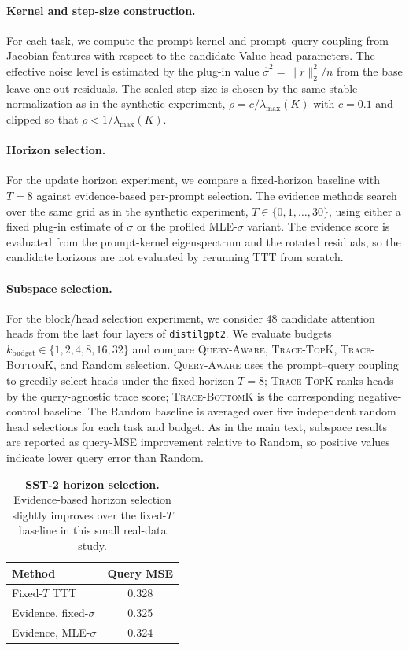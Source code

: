 \documentclass{article}
\theoremstyle{plain}
\theoremstyle{definition}
\theoremstyle{remark}
\begin{document}
\paragraph{Kernel and step-size construction.}
For each task, we compute the prompt kernel and prompt--query coupling from Jacobian features with respect to the candidate Value-head parameters. The effective noise level is estimated by the plug-in value $\hat\sigma^2=\|r\|_2^2/n$ from the base leave-one-out residuals. The scaled step size is chosen by the same stable normalization as in the synthetic experiment, $\rho=c/\lambda_{\max}(K)$ with $c=0.1$ and clipped so that $\rho<1/\lambda_{\max}(K)$.

\paragraph{Horizon selection.}
For the update horizon experiment, we compare a fixed-horizon baseline with $T=8$ against evidence-based per-prompt selection. The evidence methods search over the same grid as in the synthetic experiment, $T\in\{0,1,\ldots,30\}$, using either a fixed plug-in estimate of $\sigma$ or the profiled MLE-$\sigma$ variant. The evidence score is evaluated from the prompt-kernel eigenspectrum and the rotated residuals, so the candidate horizons are not evaluated by rerunning TTT from scratch.

\paragraph{Subspace selection.}
For the block/head selection experiment, we consider 48 candidate attention heads from the last four layers of \texttt{distilgpt2}. We evaluate budgets $k_{\text{budget}}\in\{1,2,4,8,16,32\}$ and compare \textsc{Query-Aware}, \textsc{Trace-TopK}, \textsc{Trace-BottomK}, and Random selection. \textsc{Query-Aware} uses the prompt--query coupling to greedily select heads under the fixed horizon $T=8$; \textsc{Trace-TopK} ranks heads by the query-agnostic trace score; \textsc{Trace-BottomK} is the corresponding negative-control baseline. The Random baseline is averaged over five independent random head selections for each task and budget. As in the main text, subspace results are reported as query-MSE improvement relative to Random, so positive values indicate lower query error than Random.

\begin{table}[h]
\centering
\small
\begin{tabular}{lc}
\toprule
Method & Query MSE \\
\midrule
Fixed-$T$ TTT & 0.328 \\
Evidence, fixed-$\sigma$ & 0.325 \\
Evidence, MLE-$\sigma$ & 0.324 \\
\bottomrule
\end{tabular}
\caption{\textbf{SST-2 horizon selection.} Evidence-based horizon selection slightly improves over the fixed-$T$ baseline in this small real-data study.}
\label{tab:app_sst2_horizon}
\end{table}
\end{document}
